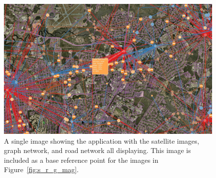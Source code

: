 \begin{figure}[htp]\centering
    \includegraphics[width=1.0\linewidth]{img/s_r_g_no_zoom.jpg}
    \caption[Full Application without Linear Magnification]{A single image showing the application with the satellite images, graph network, and road network all displaying. This image is included as a base reference point for the images in Figure~\ref{fig:s_r_g_mag}.}
    \label{fig:s_r_g_no_zoom}
\end{figure}

